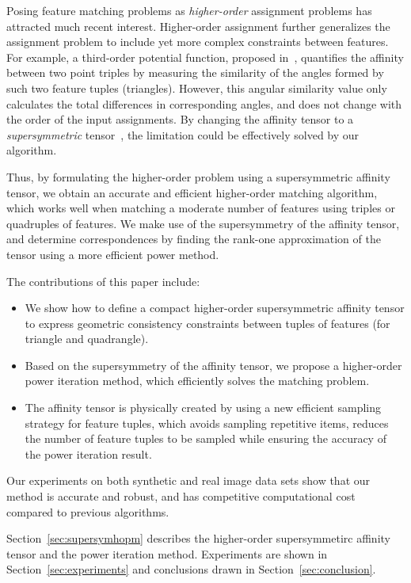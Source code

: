 Posing feature matching problems as \emph{higher-order} assignment problems has attracted much recent interest.
Higher-order assignment further generalizes the assignment problem to include yet more complex constraints between features.
For example, a third-order potential function, proposed in~\cite{Duchenne_etal09,Chertok10},
quantifies the affinity between two point triples
by measuring the similarity of the angles formed by such two feature tuples (triangles).
However, this angular similarity value only calculates the total differences in corresponding angles,
and does not change with the order of the input assignments.
By changing the affinity tensor to a \emph{supersymmetric} tensor~\cite{Kofidis02}, the limitation could be effectively solved by our algorithm.

Thus, by formulating the higher-order problem using a supersymmetric affinity tensor,
we obtain an accurate and efficient higher-order matching algorithm,
which works well when matching a moderate number of features using triples or quadruples of features.
We make use of the supersymmetry of the affinity tensor,
and determine correspondences by finding the rank-one approximation of the tensor using a more efficient power method.

The contributions of this paper include:
\begin{itemize}
\item We show how to define a compact higher-order supersymmetric affinity tensor to express geometric consistency constraints between tuples of features (for triangle and quadrangle).

\item Based on the supersymmetry of the affinity tensor, we propose a higher-order power iteration method, which efficiently solves the matching problem.

\item The affinity tensor is physically created by using a new efficient sampling strategy for feature tuples,
which avoids sampling repetitive items, reduces the number of feature tuples to be sampled while ensuring the accuracy of the power iteration result.


\end{itemize}

Our experiments on both synthetic and real image
data sets show that our method is accurate and robust,
and has competitive computational cost compared to previous algorithms.

Section~\ref{sec:supersymhopm} describes the higher-order supersymmetirc affinity tensor and the power iteration method.
Experiments are shown in Section~\ref{sec:experiments} and conclusions drawn in Section~\ref{sec:conclusion}. 